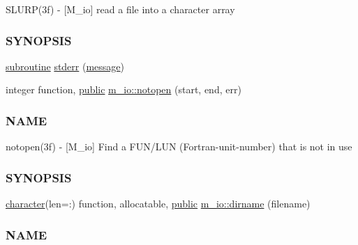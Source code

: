 \begin{DoxyCompactItemize}
\begin{DoxyCompactList}
S\+L\+U\+R\+P(3f) -\/ \mbox{[}M\+\_\+io\mbox{]} read a file into a character array \subsubsection*{S\+Y\+N\+O\+P\+S\+IS}\end{DoxyCompactList}\item 
\hyperlink{M__stopwatch_83_8txt_acfbcff50169d691ff02d4a123ed70482}{subroutine} \hyperlink{M__io_8f90_a448cccd08d4d6bce645ffbbf14cdfa7e}{stderr} (\hyperlink{M__stopwatch_83_8txt_aa4313e9a55405841f95e6550cd87fc3b}{message})
\item 
integer function, \hyperlink{M__stopwatch_83_8txt_a2f74811300c361e53b430611a7d1769f}{public} \hyperlink{namespacem__io_a673f7f7e137424eed9c6a736901a5cbc}{m\+\_\+io\+::notopen} (start, end, err)
\begin{DoxyCompactList}\small\item\em \subsubsection*{N\+A\+ME}

notopen(3f) -\/ \mbox{[}M\+\_\+io\mbox{]} Find a F\+U\+N/\+L\+UN (Fortran-\/unit-\/number) that is not in use \subsubsection*{S\+Y\+N\+O\+P\+S\+IS}\end{DoxyCompactList}\item 
\hyperlink{option__stopwatch_83_8txt_abd4b21fbbd175834027b5224bfe97e66}{character}(len=\+:) function, allocatable, \hyperlink{M__stopwatch_83_8txt_a2f74811300c361e53b430611a7d1769f}{public} \hyperlink{namespacem__io_a85eb6aa886ca8e591fdc837919f81708}{m\+\_\+io\+::dirname} (filename)
\begin{DoxyCompactList}\small\item\em \subsubsection*{N\+A\+ME}


\end{DoxyCompactList}
\end{DoxyCompactItemize}
